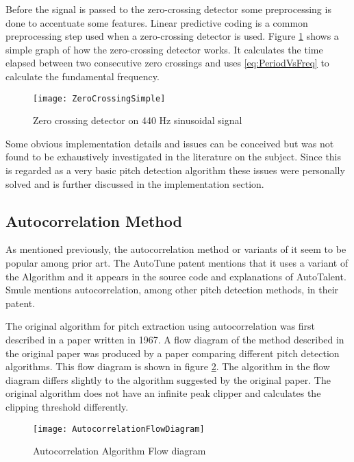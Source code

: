 Before the signal is passed to the zero-crossing detector some preprocessing is
done to accentuate some features. Linear predictive coding is a common
preprocessing step used when a zero-crossing detector is used\cite{PDABook}.
Figure \ref{fig:ZeroCrossing} shows a simple graph of how the zero-crossing
detector works. It calculates the time elapsed between two consecutive zero
crossings and uses \ref{eq:PeriodVsFreq} to calculate the fundamental frequency.

\begin{figure}[h]
	\label{fig:ZeroCrossing}
	\texttt{[image: ZeroCrossingSimple]}
	\caption{Zero crossing detector on 440 Hz sinusoidal signal}
\end{figure}

Some obvious implementation details and issues can be conceived but was not found
to be exhaustively investigated in the literature on the subject. Since this is
regarded as a very basic pitch detection algorithm these issues were personally
solved and is further discussed in the implementation section.

\subsection{Autocorrelation Method}

As mentioned previously, the autocorrelation method or variants of it seem to be
popular among prior art. The AutoTune patent\cite{AutoTunePatent} mentions that it
uses a variant of the Algorithm and it appears in the source code and explanations
of AutoTalent\cite{AutoTalent}. Smule mentions autocorrelation, among other pitch
detection methods, in their patent\cite{SmulePatent}.

The original algorithm for pitch extraction using autocorrelation was first
described in a paper written in 1967\cite{OriginalAutocorrelation}. A flow
diagram of the method described in the original paper was produced by a paper
comparing different pitch detection algorithms\cite{ComparitivePitch}. This flow
diagram is shown in figure \ref{fig:AutocorrelationFlowDiagram}. The algorithm in
the flow diagram differs slightly to the algorithm suggested by the original
paper. The original algorithm does not have an infinite peak clipper and
calculates the clipping threshold differently.

\begin{figure}[h]
	\texttt{[image: AutocorrelationFlowDiagram]}
	\caption{Autocorrelation Algorithm Flow diagram\cite{ComparitivePitch}}
	\label{fig:AutocorrelationFlowDiagram}
\end{figure}

